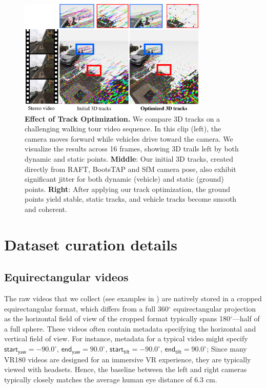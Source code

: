 \begin{figure}[ht]
    \centering
    \includegraphics[width=0.8\textwidth]{fig/supp/track_optimization_car_comparison-2.pdf}
    \caption{\textbf{Effect of Track Optimization.} We compare 3D tracks on a challenging walking tour video sequence. In this clip (left), the camera moves forward while vehicles drive toward the camera. We visualize the results across 16 frames, showing 3D trails left by both dynamic and static points.  \textbf{Middle}: Our initial 3D tracks, created directly from RAFT, BootsTAP and SfM camera pose, also exhibit significant jitter for both dynamic (vehicle) and static (ground) points.  \textbf{Right}: After applying our track optimization, the ground points yield stable, static tracks, and vehicle tracks become smooth and coherent.}
\label{fig:supp:track_comparison}
\end{figure}

\section{Dataset curation details}
\subsection{Equirectangular videos}
The raw videos that we collect (see examples in ) are natively stored in a cropped equirectangular format, which differs from a full 360$^\circ$ equirectangular projection as the horizontal field of view of the cropped format typically spans 180$^\circ$---half of a full sphere. These videos often contain metadata specifying the horizontal and vertical field of view. 
For instance, metadata for a typical video might specify 
$\mathsf{start_{yaw}}=-90.0^\circ$, $\mathsf{end_{yaw}}=90.0^\circ$,  $\mathsf{start_{tilt}}=-90.0^\circ$, $\mathsf{end_{tilt}}=90.0^\circ$; 
Since many VR180 videos are designed for an immersive VR experience, they are typically viewed with headsets. Hence, the baseline between the left and right cameras typically closely matches the average human eye distance of 6.3 cm.



